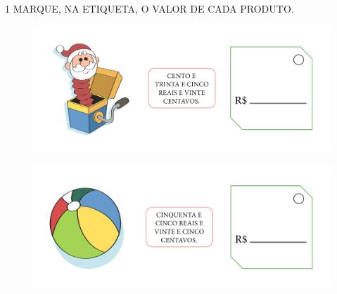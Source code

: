 



\num{1} MARQUE, NA ETIQUETA, O VALOR DE CADA PRODUTO.


\begin{figure}[htpb!]
\includegraphics[width=\textwidth]{../ilustracoes/MAT1/SAEB_1ANO_MAT_FIGURA65.png}
\end{figure}

\pagebreak

\begin{figure}[htpb!]
\includegraphics[width=\textwidth]{../ilustracoes/MAT1/SAEB_1ANO_MAT_FIGURA66.png}
\end{figure}

